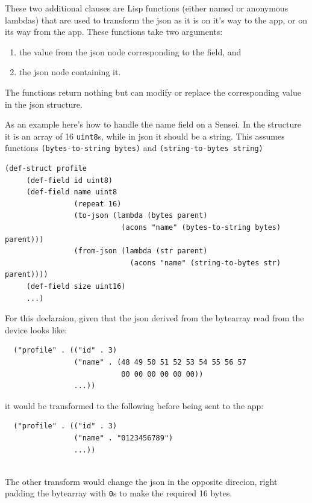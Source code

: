 \documentclass[12pt]{article}
\begin{document}
These two additional clauses are Lisp functions (either named or
anonymous lambdas) that are used to transform the json as it is on
it's way to the app, or on its way from the app. These functions take
two arguments:

\begin{enumerate} 
\item the value from the json node corresponding
to the field, and
\item the json node containing it. 
\end{enumerate}

The functions return nothing but can modify or replace the
corresponding value in the json structure.

As an example here's how to handle the name field on a Sensei. In the
structure it is an array of 16 \verb|uint8|s, while in json it should
be a string. This assumes functions \verb|(bytes-to-string bytes)| and
\verb|(string-to-bytes string)|

\begin{verbatim} 
(def-struct profile
     (def-field id uint8)
     (def-field name uint8 
                (repeat 16)
                (to-json (lambda (bytes parent)
                           (acons "name" (bytes-to-string bytes) parent)))
                (from-json (lambda (str parent)
                             (acons "name" (string-to-bytes str) parent))))
     (def-field size uint16)
     ...)
\end{verbatim}

\noindent For this declaraion, given that the json derived from the
bytearray read from the device looks like:

\begin{verbatim}
  ("profile" . (("id" . 3)
                ("name" . (48 49 50 51 52 53 54 55 56 57 
                           00 00 00 00 00 00))
                ...))
\end{verbatim}

\noindent it would be transformed to the following before being sent
to the app:

\begin{verbatim}
  ("profile" . (("id" . 3)
                ("name" . "0123456789")
                ...))
 
\end{verbatim}

\noindent The other transform would change the json in the opposite
direcion, right padding the bytearray with \verb|0|s to make the
required 16 bytes.
\end{document}
